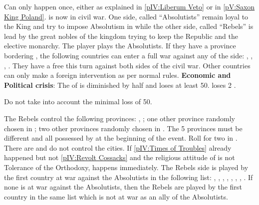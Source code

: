 \phevnt
\aparag Can only happen once, either as explained in \ref{pIV:Liberum Veto} or
in \ref{pV:Saxon King Poland}.
\aparag \POL is now in civil war. One side, called ``Absolutists'' remain
loyal to the King and try to impose Absolutism in \POL while the other side,
called ``Rebels'' is lead by the great nobles of the kingdom trying to keep
the Republic and the elective monarchy.
\bparag The player plays the Absolutists.
\aparag If they have a province bordering \POL, the following countries can
enter a full war against any of the side: \RUS, \SUE, \HAB, \PRU.
\bparag They have a free \CB this turn against both sides of the civil war.
\bparag Other countries can only make a foreign intervention as per normal
rules.
\aparag \textbf{Economic and Political crisis}: The \RT of \POL is diminished
by half and loses at least 50\ducats. \POL loses 2 \STAB.
\begin{oldcompta}
  \bparag Do not take into account the minimal loss of 50\ducats.
\end{oldcompta}
\aparag The Rebels control the following provinces:
\bparag \provinceMalopolska, \provinceLietuva ;
\bparag one other province randomly chosen in \paysmajeurPologne;
\bparag two other provinces randomly chosen in \paysmajeurLithuanie.
\bparag The 5 provinces must be different and all possessed by \POL at the
beginning of the event.
\aparag Roll for two \REVOLT in \POL. There are \facemoins and do not control
the cities.
\aparag If \ref{pIV:Times of Troubles} already happened but not
\ref{pIV:Revolt Cossacks} and the religious attitude of \POL is not Tolerance
of the Orthodoxy,  happens immediately.
\aparag The Rebels side is played by the first country at war against the
Absolutists in the following list: \RUS, \SUE, \HAB, \TUR, \HOL, \ANG, \FRA,
\PRU.
\bparag If none is at war against the Absolutists, then the Rebels are played
by the first country in the same list which is not at war as an ally of the
Absolutists.

